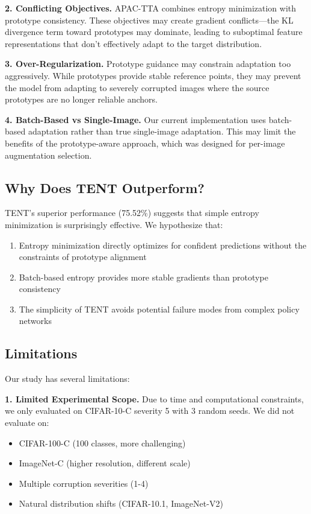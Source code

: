 \documentclass{article}
\begin{document}
\textbf{2. Conflicting Objectives.} APAC-TTA combines entropy minimization with prototype consistency. These objectives may create gradient conflicts---the KL divergence term toward prototypes may dominate, leading to suboptimal feature representations that don't effectively adapt to the target distribution.

\textbf{3. Over-Regularization.} Prototype guidance may constrain adaptation too aggressively. While prototypes provide stable reference points, they may prevent the model from adapting to severely corrupted images where the source prototypes are no longer reliable anchors.

\textbf{4. Batch-Based vs Single-Image.} Our current implementation uses batch-based adaptation rather than true single-image adaptation. This may limit the benefits of the prototype-aware approach, which was designed for per-image augmentation selection.

\subsection{Why Does TENT Outperform?}

TENT's superior performance (75.52\%) suggests that simple entropy minimization is surprisingly effective. We hypothesize that:
\begin{enumerate}
    \item Entropy minimization directly optimizes for confident predictions without the constraints of prototype alignment
    \item Batch-based entropy provides more stable gradients than prototype consistency
    \item The simplicity of TENT avoids potential failure modes from complex policy networks
\end{enumerate}

\subsection{Limitations}

Our study has several limitations:

\textbf{1. Limited Experimental Scope.} Due to time and computational constraints, we only evaluated on CIFAR-10-C severity 5 with 3 random seeds. We did not evaluate on:
\begin{itemize}
    \item CIFAR-100-C (100 classes, more challenging)
    \item ImageNet-C (higher resolution, different scale)
    \item Multiple corruption severities (1-4)
    \item Natural distribution shifts (CIFAR-10.1, ImageNet-V2)
\end{itemize}
\end{document}
